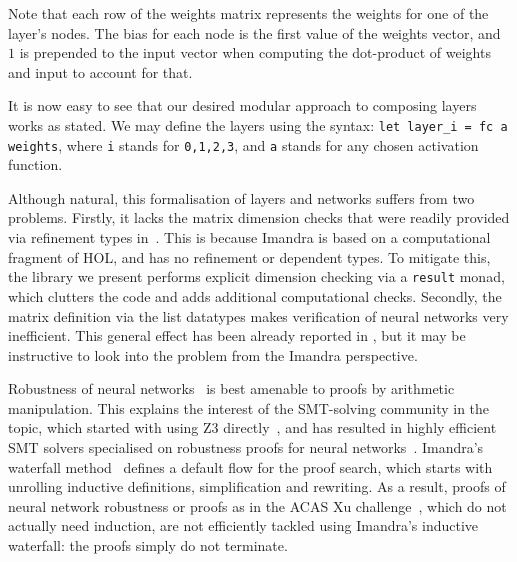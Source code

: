 \documentclass[runningheads]{llncs}
\begin{document}
Note that each row of the weights matrix
represents the weights for one of the layer's nodes. The bias for each node is
the first value of the weights vector, and $1$ is prepended to the input vector
when computing the dot-product of weights and input to account for that.



  It is now easy to see that our desired modular approach to composing layers works as stated. We may define the layers using the syntax:
  \lstinline{let layer_i = fc a weights}, where \lstinline{i} stands for \lstinline{0,1,2,3}, and \lstinline{a} stands for any chosen activation function. 

  Although natural, this formalisation of layers and networks suffers from two problems.  Firstly, it lacks the matrix dimension checks that were readily provided  via refinement types in~\cite{KokkeKKAA20}. This is because Imandra is based on a computational fragment of HOL, and has no refinement or dependent types. To mitigate this, the library we present performs explicit dimension checking via a {\tt result} monad, which clutters the code and adds additional computational checks.
  Secondly, the matrix definition via the list datatypes makes verification of neural networks very inefficient.
  This general effect has been already reported in \cite{KokkeKKAA20}, but it may be instructive to look into the problem from the Imandra perspective.

   Robustness of neural networks~\cite{CKDKKAE22} is best amenable to proofs by arithmetic manipulation. This explains the interest of the SMT-solving community in the topic, which started with using Z3 directly~\cite{HuangKWW17}, and has resulted in highly efficient SMT solvers specialised on robustness proofs for neural networks~\cite{KaBaDiJuKo17Reluplex,KatzHIJLLSTWZDK19}.   Imandra's waterfall method~\cite{PassmoreCIABKKM20} defines a default flow for the proof search, which starts with unrolling inductive definitions, simplification and rewriting.
  As a result, proofs of neural network robustness or proofs as in the ACAS Xu challenge~\cite{KaBaDiJuKo17Reluplex,KatzHIJLLSTWZDK19}, which do not actually need induction,
  are not efficiently tackled using Imandra's inductive waterfall: the proofs simply do not terminate.
\end{document}
